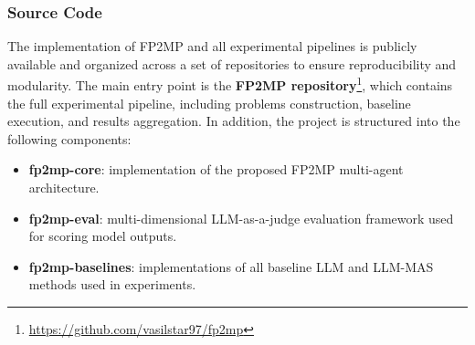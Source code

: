 \begin{table}[h]
\centering
\small
{}
\caption{Architectural comparison of baseline methods across key properties of LLM-agent systems.}
\label{table:baselines}
\end{table}

\subsubsection{Source Code}

The implementation of FP2MP and all experimental pipelines is publicly available and organized across a set of repositories to ensure reproducibility and modularity.
The main entry point is the \textbf{FP2MP repository}\footnote{\url{https://github.com/vasilstar97/fp2mp}}, which contains the full experimental pipeline, including problems construction, baseline execution, and results aggregation.
In addition, the project is structured into the following components:

\begin{itemize}
    \item \textbf{fp2mp-core}: implementation of the proposed FP2MP multi-agent architecture.
    \item \textbf{fp2mp-eval}: multi-dimensional LLM-as-a-judge evaluation framework used for scoring model outputs.
    \item \textbf{fp2mp-baselines}: implementations of all baseline LLM and LLM-MAS methods used in experiments.
\end{itemize}

